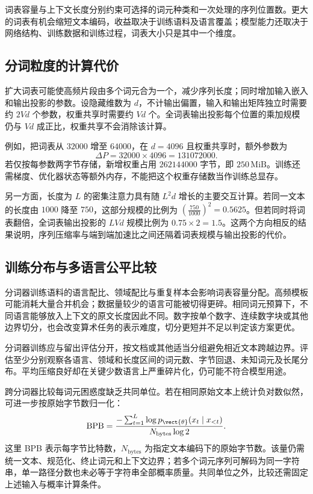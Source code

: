 \documentclass[../textbook.tex]{subfiles}
\begin{document}
词表容量与上下文长度分别约束可选择的词元种类和一次处理的序列位置数。更大的词表有机会缩短文本编码，收益取决于训练语料及语言覆盖；模型能力还取决于网络结构、训练数据和训练过程，词表大小只是其中一个维度。

\subsection{分词粒度的计算代价}
扩大词表可能使高频片段由多个词元合为一个，减少序列长度；同时增加输入嵌入和输出投影的参数。设隐藏维数为 $d$，不计输出偏置，输入和输出矩阵独立时需要约 $2Vd$ 个参数，权重共享时需要约 $Vd$ 个。全词表输出投影每个位置的乘加规模仍与 $Vd$ 成正比，权重共享不会消除该计算。

例如，把词表从 $\num{32000}$ 增至 $\num{64000}$，在 $d=\num{4096}$ 且权重共享时，额外参数为
\begin{equation}
 \Delta P=\num{32000}\times\num{4096}=\num{131072000}.
\end{equation}
若仅按每参数两字节存储，新增权重占用 $\num{262144000}$ 字节，即 $250\,\mathrm{MiB}$。训练还需梯度、优化器状态等额外内存，不能把这个权重存储数当作训练总显存。

另一方面，长度为 $L$ 的密集注意力具有随 $L^2d$ 增长的主要交互计算。若同一文本的长度由 $1000$ 降至 $750$，这部分规模的比例为 $(\frac{750}{1000})^2=0.5625$。但若同时将词表翻倍，全词表输出投影的 $LVd$ 规模比例为 $0.75\times2=1.5$。这两个方向相反的结果说明，序列压缩率与端到端加速比之间还隔着词表规模与输出投影的代价。

\subsection{训练分布与多语言公平比较}
分词器训练语料的语言配比、领域配比与重复样本会影响词表容量分配。高频模板可能消耗大量合并机会；数据量较少的语言可能被切得更碎。相同词元预算下，不同语言能够放入上下文的原文长度因此不同。数字按单个数字、连续数字块或其他边界切分，也会改变算术任务的表示难度，切分更短并不足以判定该方案更优。

分词器训练应与留出评估分开，按文档或其他适当分组避免相近文本跨越边界。评估至少分别观察各语言、领域和长度区间的词元数、字节回退、未知词元及长尾分布。平均压缩良好却在关键少数语言上严重碎片化，仍可能不符合模型用途。

跨分词器比较每词元困惑度缺乏共同单位。若在相同原始文本上统计负对数似然，可进一步按原始字节数归一化：
\begin{equation}
 \operatorname{BPB}=\frac{-\sum_{t=1}^{L}\log p_{\vect{\theta}}(x_t\mid x_{<t})}
 {N_{\mathrm{bytes}}\log2}.
\end{equation}
这里 BPB 表示每字节比特数，$N_{\mathrm{bytes}}$ 为指定文本编码下的原始字节数。该量仍需统一文本、规范化、终止词元和上下文边界；若多个词元序列可解码为同一字符串，单一路径分数也未必等于字符串全部概率质量。共同单位之外，比较还需固定上述输入与概率计算条件。
\end{document}
